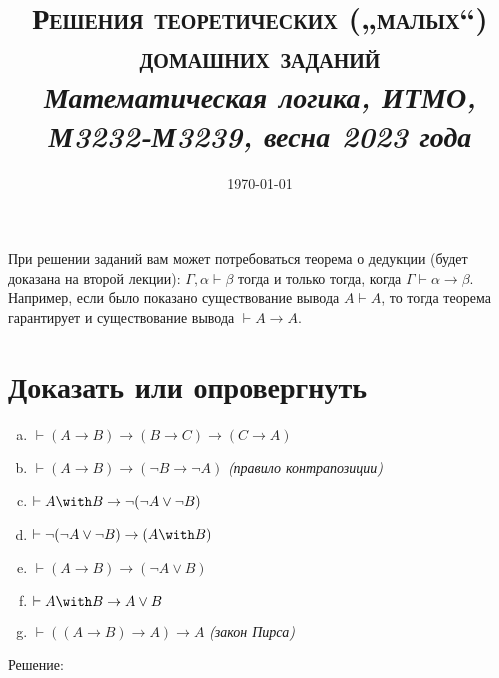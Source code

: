 \documentclass[12pt, a4paper]{article}
\title{{\Large\textsc{Решения \textbf{теоретических („малых“) домашних заданий}}}\\
\it Математическая логика, ИТМО, М3232-М3239, весна 2023 года}
\author{
  \vova
}
\date{\today}
\begin{document}
  \tittoc

При решении заданий вам может потребоваться теорема о дедукции (будет доказана на второй лекции): 
$\Gamma, \alpha \vdash \beta$ 
тогда и только тогда, когда $\Gamma \vdash \alpha\rightarrow\beta$. Например, если было показано 
существование вывода $A \vdash A$, то тогда теорема гарантирует и существование вывода $\vdash A \rightarrow A$.

\setcounter{section}{2}

\section{Доказать или опровергнуть}


\begin{enumerate}[(a)]
\item $\vdash (A \rightarrow B) \rightarrow (B \rightarrow C) \rightarrow (C \rightarrow A)$ 
\item $\vdash (A \rightarrow B) \rightarrow (\neg B \rightarrow \neg A)$ \emph{(правило контрапозиции)}
\item $\vdash A \with B \rightarrow \neg (\neg A \vee \neg B)$
\item $\vdash \neg (\neg A \vee \neg B) \rightarrow (A \with B)$
\item $\vdash (A \rightarrow B) \rightarrow (\neg A \vee B)$
\item $\vdash A \with B \rightarrow A \vee B$
\item $\vdash ((A \rightarrow B) \rightarrow A)\rightarrow A$ \emph{(закон Пирса)}
\end{enumerate}

Решение:
\end{document}
